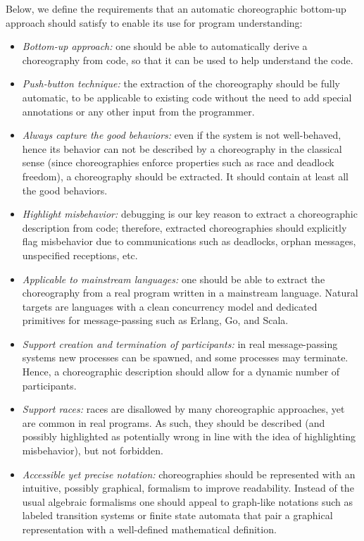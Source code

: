 Below, we define the requirements that an automatic choreographic bottom-up approach should satisfy to enable its use for program understanding:
\begin{itemize}
    \item \textit{Bottom-up approach:} one should be able to automatically derive a choreography from code, so that it can be used  to help understand the code.
    \item \textit{Push-button technique:} the extraction of the choreography
    should be fully automatic, to be applicable to existing code
    without the need to add special annotations or any other input
    from the programmer.
    \item \textit{Always capture the good behaviors:} even if the system is
    not well-behaved, hence its behavior can not be described by
    a choreography in the classical sense (since
    choreographies enforce properties such as race and deadlock
    freedom), a choreography should be extracted. It should
    contain at least all the good behaviors.
    \item \textit{Highlight misbehavior:}
    debugging is our key reason to extract a choreographic description
    from code; therefore, extracted choreographies should explicitly flag
    misbehavior due to communications such as deadlocks, orphan
    messages, unspecified receptions, etc.
    \item \textit{Applicable to mainstream languages:} one should be able to
    extract the choreography from a real program written in a
    mainstream language. Natural targets are languages with a clean concurrency model and 		dedicated primitives for message-passing such as Erlang, Go, and Scala.
    \item \textit{Support creation and termination of participants:} in real
    message-passing systems new processes can be spawned, and some processes may
    terminate. Hence, a choreographic description should allow for
    a dynamic  number of participants.
    \item \textit{Support races:} races are disallowed by many choreographic
    approaches, yet are common in real programs. As such, they should
    be described (and possibly highlighted as potentially wrong in
    line with the idea of highlighting misbehavior), but not
    forbidden.
    \item \textit{Accessible yet precise notation:} choreographies
    should be represented with an intuitive, possibly
    graphical, formalism to improve readability. Instead of the usual algebraic
    formalisms one should appeal to graph-like notations such as
    labeled transition systems or finite state automata that pair a graphical representation with a
    well-defined  mathematical definition.
\end{itemize}